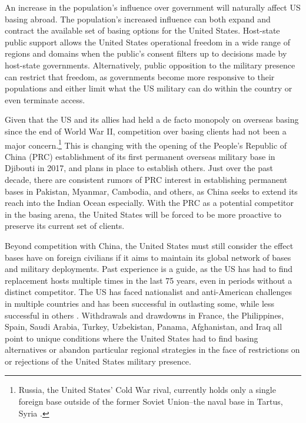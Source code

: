 {An increase in the population's influence over government will naturally affect US basing abroad. The population's increased influence can both expand and contract the available set of basing options for the United States. Host-state public support allows the United States operational freedom in a wide range of regions and domains when the public's consent filters up to decisions made by host-state governments. Alternatively, public opposition to the military presence can restrict that freedom, as governments become more responsive to their populations and either limit what the US military can do within the country or even terminate access. 

Given that the US and its allies had held a de facto monopoly on overseas basing since the end of World War II, competition over basing clients had not been a major concern.\footnote{Russia, the United States' Cold War rival, currently holds only a single foreign base outside of the former Soviet Union--the naval base in Tartus, Syria \cite{Nieman2020}.} This is changing with the opening of the People's Republic of China (PRC) establishment of its first permanent overseas military base in Djibouti in 2017, and plans in place to establish others\cite{Joyce2021,Kardon2021}. Just over the past decade, there are consistent rumors of PRC interest in establishing permanent bases in Pakistan, Myanmar, Cambodia, and others, as China seeks to extend its reach into the Indian Ocean especially. With the PRC as a potential competitor in the basing arena, the United States will be forced to be more proactive to preserve its current set of clients. 

Beyond competition with China, the United States must still consider the effect bases have on foreign civilians if it aims to maintain its global network of bases and military deployments. Past experience is a guide, as the US has had to find replacement hosts multiple times in the last 75 years, even in periods without a distinct competitor. The US has faced nationalist and anti-American challenges in multiple countries and has been successful in outlasting some, while less successful in others \cite{blaker1990,Baker2004}. Withdrawals and drawdowns in France, the Philippines, Spain, Saudi Arabia, Turkey, Uzbekistan, Panama, Afghanistan, and Iraq all point to unique conditions where the United States had to find basing alternatives or abandon particular regional strategies in the face of restrictions on or rejections of the United States military presence. 
	
}
